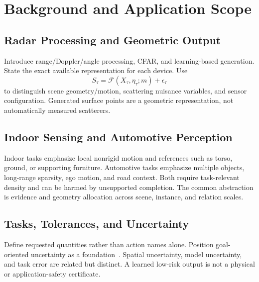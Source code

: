 \section{Background and Application Scope}
\label{sec:background}
\subsection{Radar Processing and Geometric Output}
Introduce range/Doppler/angle processing, CFAR, and learning-based generation. State the exact available representation for each device. Use
\begin{equation}
S_\tau=\mathcal F(X_\tau,\eta_\tau;m)+\epsilon_\tau
\end{equation}
to distinguish scene geometry/motion, scattering nuisance variables, and sensor configuration. Generated surface points are a geometric representation, not automatically measured scatterers.

\subsection{Indoor Sensing and Automotive Perception}
Indoor tasks emphasize local nonrigid motion and references such as torso, ground, or supporting furniture. Automotive tasks emphasize multiple objects, long-range sparsity, ego motion, and road context. Both require task-relevant density and can be harmed by unsupported completion. The common abstraction is evidence and geometry allocation across scene, instance, and relation scales.

\subsection{Tasks, Tolerances, and Uncertainty}
Define requested quantities rather than action names alone. Position goal-oriented uncertainty as a foundation~\cite{goalved2023}. Spatial uncertainty, model uncertainty, and task error are related but distinct. A learned low-risk output is not a physical or application-safety certificate.
